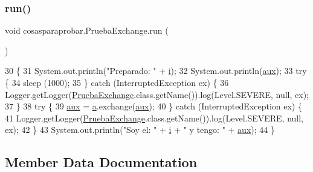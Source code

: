 \subsubsection{\texorpdfstring{run()}{run()}}
{\footnotesize\ttfamily void cosasparaprobar.\+Prueba\+Exchange.\+run (\begin{DoxyParamCaption}{ }\end{DoxyParamCaption})\hspace{0.3cm}{\ttfamily [inline]}}


\begin{DoxyCode}
30     \{
31         System.out.println(\textcolor{stringliteral}{"Preparado: "} + \mbox{\hyperlink{classcosasparaprobar_1_1_prueba_exchange_ad45f6d758155fab2ad13a5f7b403c1b6}{i}});
32         System.out.println(\mbox{\hyperlink{classcosasparaprobar_1_1_prueba_exchange_a6b85e0f1bfaba3f17f162a97625b6e64}{aux}});
33         \textcolor{keywordflow}{try} \{
34             sleep (1000);
35         \} \textcolor{keywordflow}{catch} (InterruptedException ex) \{
36             Logger.getLogger(\mbox{\hyperlink{classcosasparaprobar_1_1_prueba_exchange_ad9e7b50dfabee058757d9f2fb7ea83b1}{PruebaExchange}}.class.getName()).log(Level.SEVERE, null, ex);
37         \}
38         \textcolor{keywordflow}{try} \{
39             \mbox{\hyperlink{classcosasparaprobar_1_1_prueba_exchange_a6b85e0f1bfaba3f17f162a97625b6e64}{aux}} = \mbox{\hyperlink{classcosasparaprobar_1_1_prueba_exchange_a9c9b91539573982d12dc4f56a948e527}{a}}.exchange(\mbox{\hyperlink{classcosasparaprobar_1_1_prueba_exchange_a6b85e0f1bfaba3f17f162a97625b6e64}{aux}});
40         \} \textcolor{keywordflow}{catch} (InterruptedException ex) \{
41             Logger.getLogger(\mbox{\hyperlink{classcosasparaprobar_1_1_prueba_exchange_ad9e7b50dfabee058757d9f2fb7ea83b1}{PruebaExchange}}.class.getName()).log(Level.SEVERE, null, ex);
42         \}
43         System.out.println(\textcolor{stringliteral}{"Soy el: "} + \mbox{\hyperlink{classcosasparaprobar_1_1_prueba_exchange_ad45f6d758155fab2ad13a5f7b403c1b6}{i}} + \textcolor{stringliteral}{" y tengo: "} + \mbox{\hyperlink{classcosasparaprobar_1_1_prueba_exchange_a6b85e0f1bfaba3f17f162a97625b6e64}{aux}});
44     \}
\end{DoxyCode}


\subsection{Member Data Documentation}
\mbox{\label{classcosasparaprobar_1_1_prueba_exchange_a9c9b91539573982d12dc4f56a948e527}} 

